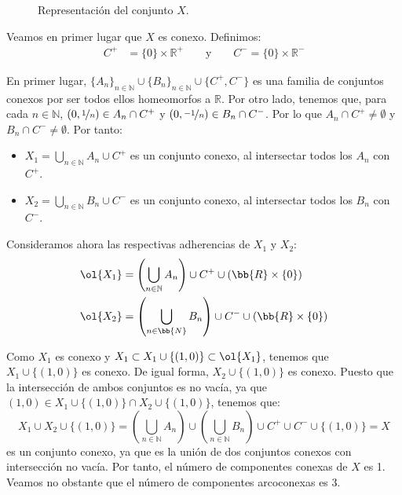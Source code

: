 \begin{ejercicio}
\begin{figure}
        \caption{Representación del conjunto $X$.}
        \label{fig:conjunto_X}
    \end{figure}

    Veamos en primer lugar que $X$ es conexo. Definimos:
    \begin{align*}
        C^+ &= \{0\}\times \mathbb{R}^+ \qquad \text{y} \qquad C^- = \{0\}\times \mathbb{R}^-
    \end{align*}

    En primer lugar, $\{A_n\}_{n\in \mathbb{N}}\cup \{B_n\}_{n\in \mathbb{N}}\cup \{C^+,C^-\}$ es una familia de conjuntos conexos por ser todos ellos homeomorfos a $\mathbb{R}$. Por otro lado, tenemos que, para cada $n\in \mathbb{N}$, $(0,\nicefrac{1}{n})\in A_n \cap C^+$ y $(0,\nicefrac{-1}{n})\in B_n \cap C^-$. Por lo que $A_n\cap C^+ \neq \emptyset$ y $B_n\cap C^- \neq \emptyset$. Por tanto:
    \begin{itemize}
        \item $X_1 = \bigcup\limits_{n\in \mathbb{N}}A_n \cup C^+$ es un conjunto conexo, al intersectar todos los $A_n$ con $C^+$.
        \item $X_2 = \bigcup\limits_{n\in \mathbb{N}}B_n \cup C^-$ es un conjunto conexo, al intersectar todos los $B_n$ con $C^-$.
    \end{itemize}

    Consideramos ahora las respectivas adherencias de $X_1$ y $X_2$:
    \begin{align*}
        \ol{X_1} &= \left(\bigcup_{n\in \mathbb{N}}A_n\right) \cup C^+ \cup \left(\bb{R}\times \{0\}\right) \\
        \ol{X_2} &= \left(\bigcup_{n\in \bb{N}}B_n\right) \cup C^- \cup \left(\bb{R}\times \{0\}\right)
    \end{align*}

    Como $X_1$ es conexo y $X_1\subset X_1\cup \{(1,0)\} \subset \ol{X_1}$, tenemos que $X_1\cup \{(1,0)\}$ es conexo. De igual forma, $X_2\cup \{(1,0)\}$ es conexo. Puesto que la intersección de ambos conjuntos es no vacía, ya que $(1,0)\in X_1\cup \{(1,0)\}\cap X_2\cup \{(1,0)\}$, tenemos que:
    \begin{equation*}
        X_1\cup X_2 \cup \{(1,0)\} = \left(\bigcup_{n\in \mathbb{N}}A_n\right) \cup \left(\bigcup_{n\in \mathbb{N}}B_n\right) \cup C^+ \cup C^- \cup \{(1,0)\} = X
    \end{equation*}
    es un conjunto conexo, ya que es la unión de dos conjuntos conexos con intersección no vacía. Por tanto, el número de componentes conexas de $X$ es 1. Veamos no obstante que el número de componentes arcoconexas es 3.\\


\end{ejercicio}
